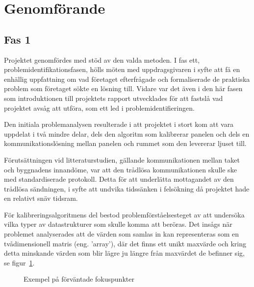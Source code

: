 \section{Genomförande} %
\label{sec:genomf_rande}
    \subsection{Fas 1} %
    \label{sub:steg_1}
        Projektet genomfördes med stöd av den valda metoden. I fas ett, problemidentifikationsfasen, hölls möten med uppdragsgivaren i syfte att få en enhällig uppfattning om vad företaget efterfrågade och formaliserade de praktiska problem som företaget sökte en lösning till. Vidare var det även i den här fasen som introduktionen till projektets rapport utvecklades för att fastslå vad projektet avsåg att utföra, som ett led i problemidentifieringen. \bigskip

        Den initiala problemanalysen resulterade i att projektet i stort kom att vara uppdelat i två mindre delar, dels den algoritm som kalibrerar panelen och dels en kommunikationslösning mellan panelen och rummet som den levererar ljuset till. \bigskip

        Förutsättningen vid litteraturstudien, gällande kommunikationen mellan taket och byggnadens innandöme, var att den trådlösa kommunikationen skulle ske med standardiserade protokoll. Detta för att underlätta mottagandet av den trådlösa sändningen, i syfte att undvika tidssänken i felsökning då projektet hade en relativt snäv tidsram.\bigskip

        För kalibreringsalgoritmens del bestod problemförståelsesteget av att undersöka vilka typer av datastrukturer som skulle komma att beröras. Det insågs när problemet analyserades att de värden som samlas in kan representeras som en tvådimensionell matris (eng. 'array'), där det finns ett unikt maxvärde och kring detta minskande värden som blir lägre ju längre från maxvärdet de befinner sig, se figur~\ref{fig:array}. \bigskip

        \begin{figure}[hbt]
        \centering
            \begin{subfigure}{0.2\textwidth}
            \end{subfigure}
            \begin{subfigure}{0.2\textwidth}
            \end{subfigure}
        \caption{\label{fig:array} Exempel på förväntade fokuspunkter}
        \end{figure}


